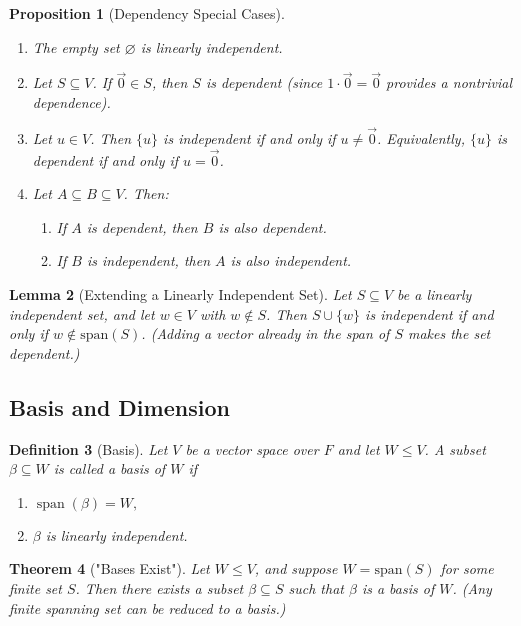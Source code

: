 \documentclass[12pt]{article}
\theoremstyle{break}             %
\newtheorem{thm}{Theorem}          %
\newtheorem{prop}[thm]{Proposition}%
\newtheorem{lem}[thm]{Lemma}
\newtheorem{defn}[thm]{Definition}
\begin{document}
\begin{prop}[Dependency Special Cases]\leavevmode\vspace{-20.5pt}
\begin{enumerate}
\item The empty set \(\varnothing\) is linearly independent.
\item Let \(S \subseteq V\). If \(\vec{0} \in S\), then \(S\) is dependent 
  (since \(1 \cdot \vec{0} = \vec{0}\) provides a nontrivial dependence).
\item Let \(u \in V\). Then \(\{u\}\) is independent if and only if \(u \neq \vec{0}\).  
  Equivalently, \(\{u\}\) is dependent if and only if \(u = \vec{0}\).
\item Let \(A \subseteq B \subseteq V\). Then:
  \begin{enumerate}
  \item If \(A\) is dependent, then \(B\) is also dependent.
  \item If \(B\) is independent, then \(A\) is also independent.
  \end{enumerate}
\end{enumerate}
\end{prop}

\begin{lem}[Extending a Linearly Independent Set]
Let \(S \subseteq V\) be a linearly independent set, and let \(w \in V\) with \(w \notin S\).  
Then \(S \cup \{w\}\) is independent if and only if \(w \notin \mathrm{span}(S)\).  
(Adding a vector already in the span of \(S\) makes the set dependent.)
\end{lem}

\subsection{Basis and Dimension}

\begin{defn}[Basis]
Let \(V\) be a vector space over \(F\) and let \(W\leq V\).  A subset \(\beta\subseteq W\) is called a \emph{basis} of \(W\) if
\begin{enumerate}
  \item \(\displaystyle \operatorname{span}(\beta) = W,\)
  \item \(\beta\) is linearly independent.
\end{enumerate}
\end{defn}

\begin{thm}["Bases Exist"]
Let \(W \le V\), and suppose \(W = \mathrm{span}(S)\) for some \emph{finite} set \(S\).  
Then there exists a subset \(\beta \subseteq S\) such that \(\beta\) is a basis of \(W\).  
(Any finite spanning set can be reduced to a basis.)
\end{thm}
\end{document}
